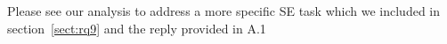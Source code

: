 \documentclass[twocolumn,5p,sort&compress]{elsarticle}
\newcommand{\bi}{\begin{itemize}}
\newcommand{\ei}{\end{itemize}}
\theoremstyle{break}
\begin{document}
Please see our analysis to address a more specific SE task which we included in section~\ref{sect:rq9} and the reply provided in A.1\\












\end{document}
